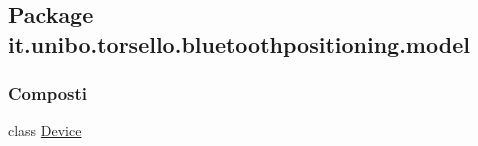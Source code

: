 \hypertarget{namespaceit_1_1unibo_1_1torsello_1_1bluetoothpositioning_1_1model}{}\subsection{Package it.\+unibo.\+torsello.\+bluetoothpositioning.\+model}
\label{namespaceit_1_1unibo_1_1torsello_1_1bluetoothpositioning_1_1model}
\subsubsection*{Composti}
\begin{DoxyCompactItemize}
\item 
class \hyperlink{classit_1_1unibo_1_1torsello_1_1bluetoothpositioning_1_1model_1_1Device}{Device}
\end{DoxyCompactItemize}
